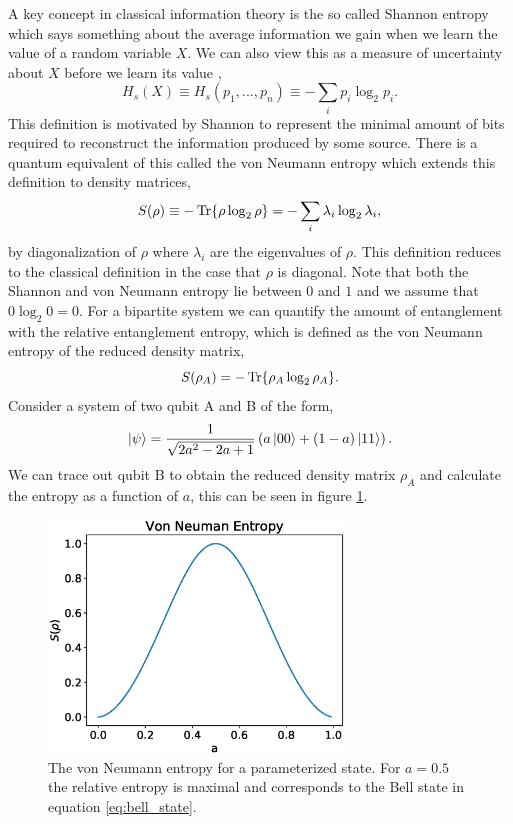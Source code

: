 A key concept in classical information theory is the so called Shannon entropy which says something about the average information we gain when we learn the value of a random variable $X$. We can also view this as a measure of uncertainty about $X$ before we learn its value \cite{Nielsen2011},
\begin{equation}
    H_s(X) \equiv H_s(p_1,...,p_n)\equiv -\sum_i p_i \log_2 p_i\label{eq:shannon}.
\end{equation}
This definition is motivated by Shannon to represent the minimal amount of bits required to reconstruct the information produced by some source. There is a quantum equivalent of this called the von Neumann entropy which extends this definition to density matrices,
\begin{equation*}
   S(\rho) \equiv -\Tr{\rho \log_2{\rho}}= - \sum_i \lambda_i \log_2 \lambda_i,
\end{equation*}
by diagonalization of $\rho$ where $\lambda_i$ are the eigenvalues of $\rho$. This definition reduces to the classical definition in the case that $\rho$ is diagonal. Note that both the Shannon and von Neumann entropy lie between $0$ and $1$ and we assume that $0 \log_2 0 = 0$. \newline
For a bipartite system we can quantify the amount of entanglement with the relative entanglement entropy, which is defined as the von Neumann entropy of the reduced density matrix,
\begin{equation*}
    S(\rho_A) = -\Tr{\rho_A \log_2{\rho_A}}\label{eq:vn_entropy_entanglement}.
\end{equation*}
Consider a system of two qubit A and B of the form,
\begin{equation*}
    \ket{\psi} = \frac{1}{\sqrt{2a^2-2a +1}} \left(a \ket{00} + (1 - a)\ket{11} \right).
\end{equation*}
We can trace out qubit B to obtain the reduced density matrix $\rho_A$ and calculate the entropy as a function of $a$, this can be seen in figure \ref{fig:bell_state_a}.
\begin{figure}[ht!]
    \centering
    \includegraphics[width=0.7\textwidth]{figures/chapter1/bell_state_a.eps}
    \caption{The von Neumann entropy for a parameterized state. For $a=0.5$ the relative entropy is maximal and corresponds to the Bell state in equation \ref{eq:bell_state}.}
    \label{fig:bell_state_a}
\end{figure}
